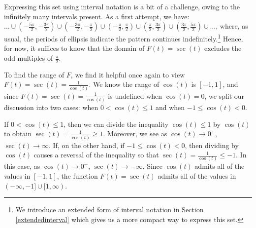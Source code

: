 \documentclass{ximera}
\begin{document}
\begin{image}
\end{image}

Expressing this set using interval notation is a bit of a challenge, owing to the infinitely many intervals present.  As a first attempt, we have:  $\ldots \cup \left( -\frac{5\pi}{2}, -\frac{3\pi}{2}\right) \cup \left( -\frac{3\pi}{2}, -\frac{\pi}{2}\right) \cup  \left(-\frac{\pi}{2}, \frac{\pi}{2}\right) \cup \left(\frac{\pi}{2}, \frac{3\pi}{2}\right) \cup  \left(\frac{3\pi}{2}, \frac{5\pi}{2}\right) \cup \ldots$, where, as usual, the periods of ellipsis indicate the pattern continues indefinitely.\footnote{We introduce an extended form of interval notation in Section \ref{extendedinterval} which gives us a more compact way to express this set. } Hence, for now, it suffices to know that the domain of $F(t) = \sec(t)$ excludes the odd multiples of $\frac{\pi}{2}$.




To find the range of $F$, we find it helpful once again to view  $F(t) = \sec(t) = \frac{1}{\cos(t)}$.   We know the range of $\cos(t)$ is $[-1,1]$, and since $F(t) = \sec(t) = \frac{1}{\cos(t)}$ is  undefined when $\cos(t) = 0$, we split our discussion into two cases: when $0 < \cos(t) \leq 1$ and when $-1 \leq \cos(t) < 0$. 



 If $0 < \cos(t) \leq 1$, then we can divide the inequality $\cos(t) \leq 1$ by  $\cos(t)$ to obtain  $\sec(t) = \frac{1}{\cos(t)} \geq 1$.  Moreover, we see as  $\cos(t) \rightarrow 0^{+}$, $\sec(t) \rightarrow \infty$.   If, on the other hand, if $-1 \leq \cos(t) < 0$, then dividing by $\cos(t)$ causes a reversal of the inequality so that $\sec(t) = \frac{1}{\cos(t)} \leq -1$.  In this case, as $\cos(t) \rightarrow 0^{-}$,  $\sec(t) \rightarrow -\infty$.   Since $\cos(t)$ admits all of the values in $[-1,1]$, the function $F(t) = \sec(t)$ admits all of the values in $(-\infty, -1] \cup [1,\infty)$.  
\end{document}
